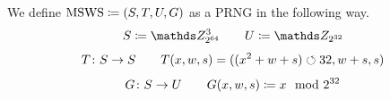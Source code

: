 \documentclass{stdlocal}
\begin{document}
    \begin{definition}
    \label{def:msws}
      We define $\mathrm{MSWS}\coloneqq(S,T,U,G)$ as a PRNG in the following way.
      \[
        S \define \setInteger_{2^{64}}^3
        \separate
        U \define \setInteger_{2^{32}}
      \]
      \[
        T\colon S\to S
        \qquad
        T(x,w,s) = ((x^2 + w + s)\circlearrowleft 32, w+s, s)
      \]
      \[
        G\colon S\to U
        \qquad
        G(x,w,s) \coloneqq x \mod 2^{32}
      \]
    \end{definition}

\end{document}
